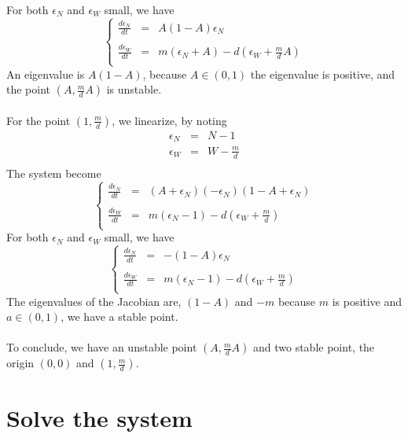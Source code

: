 \documentclass{article}
\begin{document}
For both $\epsilon_N$ and $\epsilon_W$ small, we have
\[
\left\lbrace
\begin{array}{rcl}
\frac{d\epsilon_N}{dt} & = & A(1-A)\epsilon_N \\
\\
\frac{d\epsilon_W}{dt} & = & m(\epsilon_N+A) -d(\epsilon_W+\frac{m}{d}A) \\
\end{array}
\right.
\]
An eigenvalue is $A(1-A)$, because $A\in(0,1)$ the eigenvalue is positive, and the point $(A,\frac{m}{d}A)$ is unstable.
\\
\\
For the point $(1,\frac{m}{d})$, we linearize, by noting 
\[
\begin{array}{rcl}
\epsilon_N & = & N - 1 \\
\epsilon_W & = & W - \frac{m}{d} \\
\end{array}
\]
The system become
\[
\left\lbrace
\begin{array}{rcl}
\frac{d\epsilon_N}{dt} & = & (A+\epsilon_N)(-\epsilon_N)(1-A+\epsilon_N) \\
\\
\frac{d\epsilon_W}{dt} & = & m(\epsilon_N-1) -d(\epsilon_W+\frac{m}{d}) \\
\end{array}
\right.
\]
For both $\epsilon_N$ and $\epsilon_W$ small, we have
\[
\left\lbrace
\begin{array}{rcl}
\frac{d\epsilon_N}{dt} & = & -(1-A)\epsilon_N \\
\\
\frac{d\epsilon_W}{dt} & = & m(\epsilon_N-1) -d(\epsilon_W+\frac{m}{d}) \\
\end{array}
\right.
\]
The eigenvalues of the Jacobian are, $(1-A)$ and $-m$ because $m$ is positive and $a\in(0,1)$, we have a stable point.


\paragraph{}
To conclude, we have an unstable point $(A, \frac{m}{d}A)$ and two stable point, the origin $(0,0)$ and $(1, \frac{m}{d})$.


\newpage
\section{Solve the system}

\label{technicality}
\end{document}
